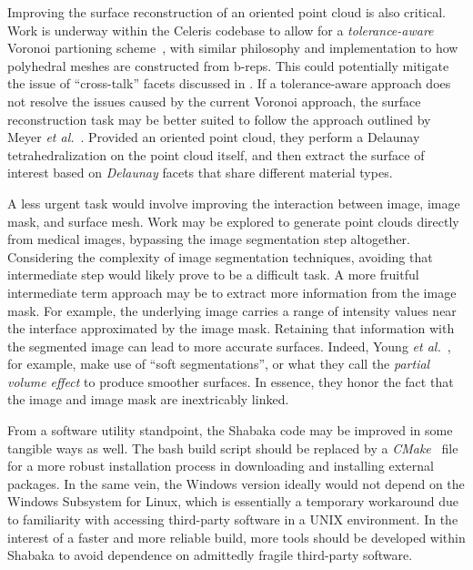 Improving the surface reconstruction of an oriented point cloud is also critical. Work is underway within the Celeris codebase to allow for a \textit{tolerance-aware} Voronoi partioning scheme~\cite{rashid_2019}, with similar philosophy and implementation to how polyhedral meshes are constructed from b-reps. This could potentially mitigate the issue of ``cross-talk'' facets discussed in . If a tolerance-aware approach does not resolve the issues caused by the current Voronoi approach, the surface reconstruction task may be better suited to follow the approach outlined by Meyer \textit{et al.}~\cite{meyer_2008}. Provided an oriented point cloud, they perform a Delaunay tetrahedralization on the point cloud itself, and then extract the surface of interest based on \textit{Delaunay} facets that share different material types.

A less urgent task would involve improving the interaction between image, image mask, and surface mesh. Work may be explored to generate point clouds directly from medical images, bypassing the image segmentation step altogether. Considering the complexity of image segmentation techniques, avoiding that intermediate step would likely prove to be a difficult task. A more fruitful intermediate term approach may be to extract more information from the image mask. For example, the underlying image carries a range of intensity values near the interface approximated by the image mask. Retaining that information with the segmented image can lead to more accurate surfaces. Indeed, Young \textit{et al.}~\cite{young_2008}, for example, make use of ``soft segmentations'', or what they call the \textit{partial volume effect} to produce smoother surfaces. In essence, they honor the fact that the image and image mask are inextricably linked.

From a software utility standpoint, the Shabaka code may be improved in some tangible ways as well. The bash build script should be replaced by a \textit{CMake}~\cite{cmake} file for a more robust installation process in downloading and installing external packages. In the same vein, the Windows version ideally would not depend on the Windows Subsystem for Linux, which is essentially a temporary workaround due to familiarity with accessing third-party software in a UNIX environment. In the interest of a faster and more reliable build, more tools should be developed within Shabaka to avoid dependence on admittedly fragile third-party software.

